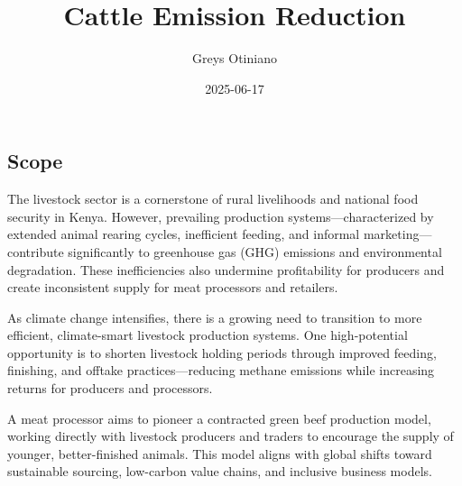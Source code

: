 \documentclass[
]{article}
\title{Cattle Emission Reduction}
\author{Greys Otiniano}
\date{2025-06-17}
\begin{document}
\maketitle

\subsection{Scope}\label{scope}

The livestock sector is a cornerstone of rural livelihoods and national
food security in Kenya. However, prevailing production
systems---characterized by extended animal rearing cycles, inefficient
feeding, and informal marketing---contribute significantly to greenhouse
gas (GHG) emissions and environmental degradation. These inefficiencies
also undermine profitability for producers and create inconsistent
supply for meat processors and retailers.

As climate change intensifies, there is a growing need to transition to
more efficient, climate-smart livestock production systems. One
high-potential opportunity is to shorten livestock holding periods
through improved feeding, finishing, and offtake practices---reducing
methane emissions while increasing returns for producers and processors.

A meat processor aims to pioneer a contracted green beef production
model, working directly with livestock producers and traders to
encourage the supply of younger, better-finished animals. This model
aligns with global shifts toward sustainable sourcing, low-carbon value
chains, and inclusive business models.
\end{document}
